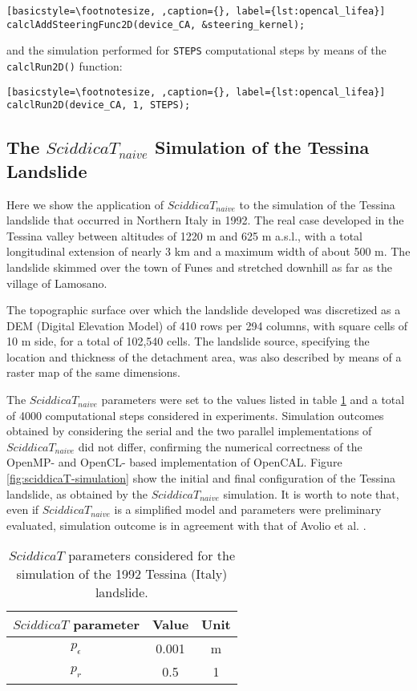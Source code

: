 \begin{lstlisting}[basicstyle=\footnotesize, ,caption={}, label={lst:opencal_lifea}]
calclAddSteeringFunc2D(device_CA, &steering_kernel);
\end{lstlisting}

\noindent and the simulation performed for \verb'STEPS'
computational steps by means of the \verb'calclRun2D()' function:

\begin{lstlisting}[basicstyle=\footnotesize, ,caption={}, label={lst:opencal_lifea}]
calclRun2D(device_CA, 1, STEPS);
\end{lstlisting}

\subsection{The $SciddicaT_{naive}$ Simulation of the Tessina Landslide}
Here we show the application of $SciddicaT_{naive}$ to the
simulation of the Tessina landslide \cite{avolio2000simulation} that
occurred in Northern Italy in 1992. The real case developed in the
Tessina valley between altitudes of 1220 m and 625 m a.s.l., with a
total longitudinal extension of nearly 3 km and a maximum width of
about 500 m. The landslide skimmed over the town of Funes and
stretched downhill as far as the village of Lamosano.

The topographic surface over which the landslide developed was
discretized as a DEM (Digital Elevation Model) of 410 rows per 294
columns, with square cells of 10 m side, for a total of 102,540
cells. The landslide source, specifying the location and thickness
of the detachment area, was also described by means of a raster map
of the same dimensions.

The $SciddicaT_{naive}$ parameters were set to the values listed in
table \ref{tab:sciddicaT-params} and a total of 4000 computational
steps considered in experiments. Simulation outcomes obtained by
considering the serial and the two parallel implementations of
$SciddicaT_{naive}$ did not differ, confirming the numerical
correctness of the OpenMP- and OpenCL- based implementation of
OpenCAL. Figure \ref{fig:sciddicaT-simulation} show the initial and
final configuration of the Tessina landslide, as obtained by the
$SciddicaT_{naive}$ simulation. It is worth to note that, even if
$SciddicaT_{naive}$ is a simplified model and parameters were
preliminary evaluated, simulation outcome is in agreement with that
of Avolio et al. \cite{avolio2000simulation}.
\begin{table}
	\centering
	\begin{tabular}{ccc}
		\hline $SciddicaT$ parameter & Value & Unit \\ \hline
		$p_\epsilon$ & 0.001 & \si{m}\\ $p_r$ & 0.5 & 1\\ \hline
	\end{tabular}
	\caption{$SciddicaT$ parameters considered for the simulation of the 1992
		Tessina (Italy) landslide.}
	\label{tab:sciddicaT-params}
\end{table}

